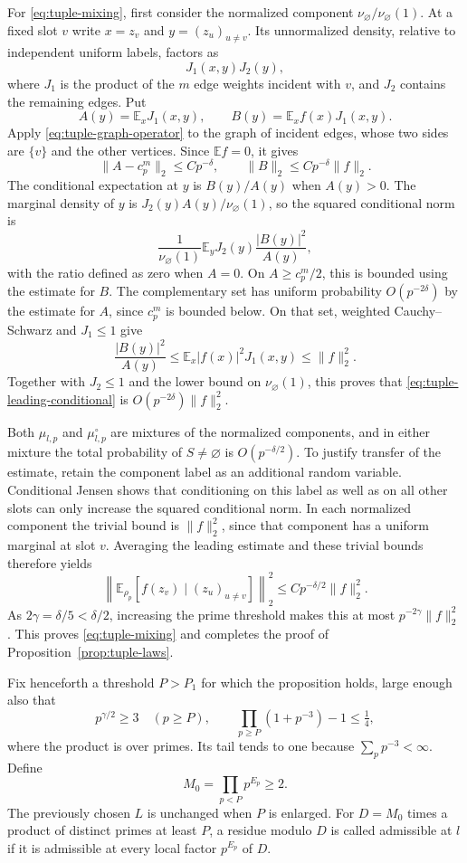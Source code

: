 For \eqref{eq:tuple-mixing}, first consider the normalized component
$\nu_\varnothing/\nu_\varnothing(1)$.  At a fixed slot $v$ write
$x=z_v$ and $y=(z_u)_{u\ne v}$.  Its unnormalized density, relative to
independent uniform labels, factors as
\[
 J_1(x,y)J_2(y),
\]
where $J_1$ is the product of the $m$ edge weights incident with $v$,
and $J_2$ contains the remaining edges.  Put
\[
 A(y)=\mathbb E_xJ_1(x,y),\qquad
 B(y)=\mathbb E_xf(x)J_1(x,y).
\]
Apply \eqref{eq:tuple-graph-operator} to the graph of incident edges,
whose two sides are $\{v\}$ and the other vertices.  Since
$\mathbb E f=0$, it gives
\[
 \|A-c_p^m\|_2\le Cp^{-\delta},\qquad
 \|B\|_2\le Cp^{-\delta}\|f\|_2.
\]
The conditional expectation at $y$ is $B(y)/A(y)$ when $A(y)>0$.
The marginal density of $y$ is
$J_2(y)A(y)/\nu_\varnothing(1)$, so the squared conditional norm is
\begin{equation}\label{eq:tuple-leading-conditional}
 \frac1{\nu_\varnothing(1)}
    \mathbb E_yJ_2(y)\frac{|B(y)|^2}{A(y)},
\end{equation}
with the ratio defined as zero when $A=0$.
On $A\ge c_p^m/2$, this is bounded using the estimate for $B$.
The complementary set has uniform probability $O(p^{-2\delta})$
by the estimate for $A$, since $c_p^m$ is bounded below.  On that set,
weighted Cauchy--Schwarz and $J_1\le1$ give
\[
 \frac{|B(y)|^2}{A(y)}
 \le\mathbb E_x|f(x)|^2J_1(x,y)\le\|f\|_2^2.
\]
Together with $J_2\le1$ and the lower bound on
$\nu_\varnothing(1)$, this proves that
\eqref{eq:tuple-leading-conditional} is
$O(p^{-2\delta})\|f\|_2^2$.

Both $\mu_{l,p}$ and $\mu_{l,p}^{\circ}$ are mixtures of the normalized
components, and in either mixture the total probability of
$S\ne\varnothing$ is $O(p^{-\delta/2})$.  To justify transfer of the
estimate, retain the component label as an additional random variable.
Conditional Jensen shows that conditioning on this label as well as on
all other slots can only increase the squared conditional norm.  In each
normalized component the trivial bound is $\|f\|_2^2$, since that
component has a uniform marginal at slot $v$.  Averaging the leading
estimate and these trivial bounds therefore yields
\[
 \left\|\mathbb E_{\rho_p}
   [f(z_v)\mid(z_u)_{u\ne v}]\right\|_2^2
 \le C p^{-\delta/2}\|f\|_2^2.
\]
As $2\gamma=\delta/5<\delta/2$, increasing the prime threshold makes
this at most $p^{-2\gamma}\|f\|_2^2$.  This proves
\eqref{eq:tuple-mixing} and completes the proof of
Proposition~\ref{prop:tuple-laws}.

Fix henceforth a threshold $P>P_1$ for which the proposition holds, large
enough also that
\begin{equation}\label{eq:prime-thresholds}
 p^{\gamma/2}\ge3\quad(p\ge P),\qquad
 \prod_{p\ge P}(1+p^{-3})-1\le\tfrac14,
\end{equation}
where the product is over primes.  Its tail tends to one because
$\sum_p p^{-3}<\infty$.  Define
\begin{equation}\label{eq:small-prime-modulus}
 M_0=\prod_{p<P}p^{E_p}\ge2.
\end{equation}
The previously chosen $L$ is unchanged when $P$ is enlarged.  For
$D=M_0$ times a product of distinct primes at least $P$, a residue
modulo $D$ is called admissible at $l$ if it is admissible at every local
factor $p^{E_p}$ of $D$.
